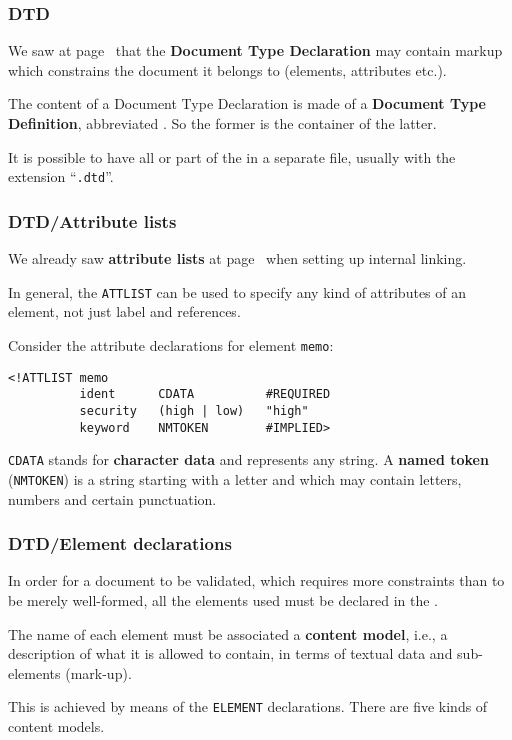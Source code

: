 
%
\begin{frame}
\frametitle{DTD}

We saw at page~\pageref{xml_intro:DOCTYPE} that the \textbf{Document
  Type Declaration} may contain markup which constrains the \XML
document it belongs to (elements, attributes etc.).

\bigskip

The content of a Document Type Declaration is made of a
\textbf{Document Type Definition}, abbreviated \DTD. So the
former is the container of the latter.

\bigskip

It is possible to have all or part of the \DTD in a separate file,
usually with the extension ``\texttt{.dtd}''.

\end{frame}

%
\begin{frame}[containsverbatim]
\frametitle{DTD/Attribute lists}

We already saw \textbf{attribute lists} at
page~\pageref{xml_intro:ATTLIST} when setting up internal linking.

\bigskip

In general, the \texttt{ATTLIST} can be used to specify any kind of
attributes of an element, not just label and references. 

\bigskip

Consider the attribute declarations for element \texttt{memo}:
{\small
\begin{verbatim}
<!ATTLIST memo
          ident      CDATA          #REQUIRED
          security   (high | low)   "high"
          keyword    NMTOKEN        #IMPLIED>
\end{verbatim}
}
\texttt{CDATA} stands for \textbf{character data} and represents any
string. A \textbf{named token} (\texttt{NMTOKEN}) is a string starting
with a letter and which may contain letters, numbers and certain
punctuation.

\end{frame}

%
\begin{frame}
\frametitle{DTD/Element declarations}

In order for a document to be validated, which requires more
constraints than to be merely well-formed, all the elements used
must be declared in the \DTD.

\bigskip

The name of each element must be associated a \textbf{content model},
i.e., a description of what it is allowed to contain, in terms of
textual data and sub-elements (mark-up).

\bigskip

This is achieved by means of the \DTD \texttt{ELEMENT}
declarations. There are five kinds of content models.

\end{frame}

